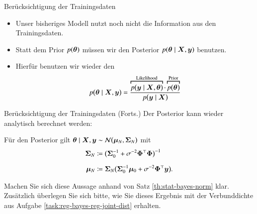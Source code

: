 \begin{frame}{Berücksichtigung der Trainingsdaten}{}
	\begin{itemize}
		\item Unser bisheriges Modell nutzt noch nicht die Information aus den Trainingsdaten.
		\item Statt dem Prior $p(\bm{\theta})$ müssen wir den Posterior $p(\bm{\theta} \mid \bm{X}, \bm{y})$ benutzen.
		\item Hierfür benutzen wir wieder den 
		\begin{equation}
			p\bigl( \btheta \mid \bX, \by \bigr)
				= \frac{\overbracket{
					p\bigl( \by \mid \bX, \btheta \bigr)
				}^{\text{Likelihood}} \cdot \overbracket{p\bigl( \btheta \bigr)}^{\text{Prior}}}{p\bigl( \by \mid \bX \bigr)}
		\end{equation}
	\end{itemize}
\end{frame}


\begin{frame}{Berücksichtigung der Trainingsdaten (Forts.)}{}
	Der Posterior kann wieder analytisch berechnet werden:
	\begin{mytheo}
		Für den Posterior gilt $\bm{\theta} \mid \bm{X}, \bm{y} \sim \mathcal{N}\bigl( \bm{\mu}_N, \bm{\Sigma}_N \bigr)$ mit
		\begin{align*}
			\bm{\Sigma}_N
				&\coloneqq \bigl( \bm{\Sigma}_0^{-1} + \sigma^{-2} \bm{\Phi}^\top \bm{\Phi} \bigr)^{-1}
		\\[2mm]
			\bm{\mu}_N
				&\coloneqq \bm{\Sigma}_N \bigl( \bm{\Sigma}_0^{-1} \bm{\mu}_0 + \sigma^{-2} \bm{\Phi}^\top \bm{y} \bigr).
		\end{align*}
	\end{mytheo}
	
	\begin{mytask}
		Machen Sie sich diese Aussage anhand von Satz \ref{th:stat-bayes-norm} klar. Zusätzlich überlegen Sie sich bitte, wie
		Sie dieses Ergebnis mit der Verbunddichte aus Aufgabe \ref{task:reg-bayes-reg-joint-dist} erhalten.
	\end{mytask}
\end{frame}


